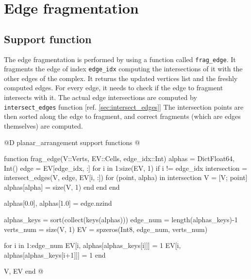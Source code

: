 \section{Edge fragmentation}
\subsection{Support function}
\label{sec:frag_edge}
The edge fragmentation is performed by using a function called \texttt{frag\_edge}.
It fragments the edge of index \texttt{edge\_idx} computing the intersections of
it with the other edges of the complex. It returns the updated vertices list and the freshly computed edges.
For every edge, it needs to check if the edge to fragment intersects with it. 
The actual edge intersections are computed by \texttt{intersect\_edges} function [ref. \ref{sec:intersect_edges}]
The intersection points are then sorted along the edge to fragment, and correct fragments (which are edges themselves)
are computed.

@D planar\_arrangement support functions
@{function frag_edge(V::Verts, EV::Cells, edge_idx::Int)
    alphas = Dict{Float64, Int}()
    edge = EV[edge_idx, :]
    for i in 1:size(EV, 1)
        if i != edge_idx
            intersection = intersect_edges(V, edge, EV[i, :])
            for (point, alpha) in intersection
                V = [V; point]
                alphas[alpha] = size(V, 1)
            end
        end
    end

    alphas[0.0], alphas[1.0] = edge.nzind

    alphas_keys = sort(collect(keys(alphas)))
    edge_num = length(alphas_keys)-1
    verts_num = size(V, 1)
    EV = spzeros(Int8, edge_num, verts_num)

    for i in 1:edge_num
        EV[i, alphas[alphas_keys[i]]] = 1
        EV[i, alphas[alphas_keys[i+1]]] = 1
    end

    V, EV
end
@}
